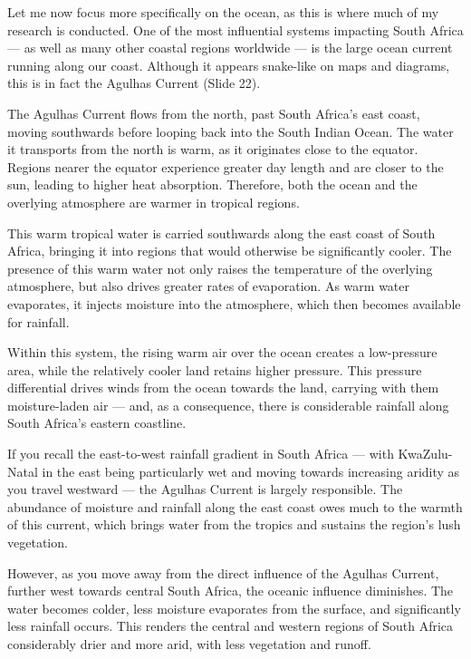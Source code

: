 \documentclass[
  11pt,
]{book}
\begin{document}
Let me now focus more specifically on the ocean, as this is where much
of my research is conducted. One of the most influential systems
impacting South Africa --- as well as many other coastal regions
worldwide --- is the large ocean current running along our coast.
Although it appears snake-like on maps and diagrams, this is in fact the
Agulhas Current (Slide 22).

The Agulhas Current flows from the north, past South Africa's east
coast, moving southwards before looping back into the South Indian
Ocean. The water it transports from the north is warm, as it originates
close to the equator. Regions nearer the equator experience greater day
length and are closer to the sun, leading to higher heat absorption.
Therefore, both the ocean and the overlying atmosphere are warmer in
tropical regions.

This warm tropical water is carried southwards along the east coast of
South Africa, bringing it into regions that would otherwise be
significantly cooler. The presence of this warm water not only raises
the temperature of the overlying atmosphere, but also drives greater
rates of evaporation. As warm water evaporates, it injects moisture into
the atmosphere, which then becomes available for rainfall.

Within this system, the rising warm air over the ocean creates a
low-pressure area, while the relatively cooler land retains higher
pressure. This pressure differential drives winds from the ocean towards
the land, carrying with them moisture-laden air --- and, as a
consequence, there is considerable rainfall along South Africa's eastern
coastline.

If you recall the east-to-west rainfall gradient in South Africa ---
with KwaZulu-Natal in the east being particularly wet and moving towards
increasing aridity as you travel westward --- the Agulhas Current is
largely responsible. The abundance of moisture and rainfall along the
east coast owes much to the warmth of this current, which brings water
from the tropics and sustains the region's lush vegetation.

However, as you move away from the direct influence of the Agulhas
Current, further west towards central South Africa, the oceanic
influence diminishes. The water becomes colder, less moisture evaporates
from the surface, and significantly less rainfall occurs. This renders
the central and western regions of South Africa considerably drier and
more arid, with less vegetation and runoff.
\end{document}
